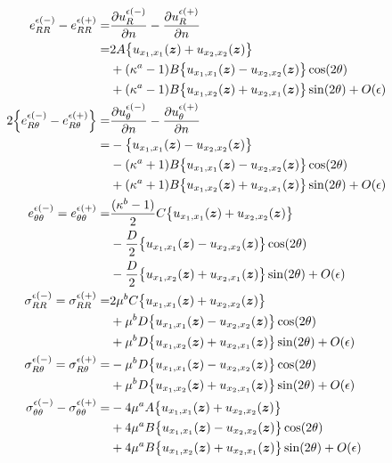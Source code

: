 \begin{align}
	e_{RR}^{\epsilon(-)}-e_{RR}^{\epsilon(+)}
		=&\frac{\partial u_{R}^{\epsilon(-)}}{\partial n}-\frac{\partial u_{R}^{\epsilon(+)}}{\partial n}
		\nonumber
		\\
		=&2A\bigl\{u_{x_{1},x_{1}}(\bm{z})+u_{x_{2},x_{2}}(\bm{z})\bigr\}
		\nonumber
		\\
		&+(\kappa^{a}-1)B\bigl\{u_{x_{1},x_{1}}(\bm{z})-u_{x_{2},x_{2}}(\bm{z})\bigr\}\cos(2\theta)
		\nonumber
		\\
		&+(\kappa^{a}-1)B\bigl\{u_{x_{1},x_{2}}(\bm{z})+u_{x_{2},x_{1}}(\bm{z})\bigr\}\sin(2\theta)+O(\epsilon)
		\nonumber
		\\
	2\Bigl\{e_{R\theta}^{\epsilon(-)}-e_{R\theta}^{\epsilon(+)}\Bigr\}
		=&\frac{\partial u_{\theta}^{\epsilon(-)}}{\partial n}-\frac{\partial u_{\theta}^{\epsilon(+)}}{\partial n}
		\nonumber
		\\
		=&-\bigl\{u_{x_{1},x_{1}}(\bm{z})-u_{x_{2},x_{2}}(\bm{z})\bigr\}
		\nonumber
		\\
		&-(\kappa^{a}+1)B\bigl\{u_{x_{1},x_{1}}(\bm{z})-u_{x_{2},x_{2}}(\bm{z})\bigr\}\cos(2\theta)
		\nonumber
		\\
		&+(\kappa^{a}+1)B\bigl\{u_{x_{1},x_{2}}(\bm{z})+u_{x_{2},x_{1}}(\bm{z})\bigr\}\sin(2\theta)+O(\epsilon)
		\nonumber
		\\
	e_{\theta\theta}^{\epsilon(-)}=e_{\theta\theta}^{\epsilon(+)}
		=&\frac{(\kappa^{b}-1)}{2}C\bigl\{u_{x_{1},x_{1}}(\bm{z})+u_{x_{2},x_{2}}(\bm{z})\bigr\}
		\nonumber
		\\
		&-\frac{D}{2}\bigl\{u_{x_{1},x_{1}}(\bm{z})-u_{x_{2},x_{2}}(\bm{z})\bigr\}\cos(2\theta)
		\nonumber
		\\
		&-\frac{D}{2}\bigl\{u_{x_{1},x_{2}}(\bm{z})+u_{x_{2},x_{1}}(\bm{z})\bigr\}\sin(2\theta)+O(\epsilon)
		\nonumber
		\\
	\sigma_{RR}^{\epsilon(-)}=\sigma_{RR}^{\epsilon(+)}
		=&2\mu^{b}C\bigl\{u_{x_{1},x_{1}}(\bm{z})+u_{x_{2},x_{2}}(\bm{z})\bigr\}
		\nonumber
		\\
		&+\mu^{b}D\bigl\{u_{x_{1},x_{1}}(\bm{z})-u_{x_{2},x_{2}}(\bm{z})\bigr\}\cos(2\theta)
		\nonumber
		\\
		&+\mu^{b}D\bigl\{u_{x_{1},x_{2}}(\bm{z})+u_{x_{2},x_{1}}(\bm{z})\bigr\}\sin(2\theta)+O(\epsilon)
		\nonumber
		\\
	\sigma_{R\theta}^{\epsilon(-)}=\sigma_{R\theta}^{\epsilon(+)}
		=&-\mu^{b}D\bigl\{u_{x_{1},x_{1}}(\bm{z})-u_{x_{2},x_{2}}(\bm{z})\bigr\}\cos(2\theta)
		\nonumber
		\\
		&+\mu^{b}D\bigl\{u_{x_{1},x_{2}}(\bm{z})+u_{x_{2},x_{1}}(\bm{z})\bigr\}\sin(2\theta)+O(\epsilon)
		\nonumber
		\\
	\sigma_{\theta\theta}^{\epsilon(-)}-\sigma_{\theta\theta}^{\epsilon(+)}
		=&-4\mu^{a}A\bigl\{u_{x_{1},x_{1}}(\bm{z})+u_{x_{2},x_{2}}(\bm{z})\bigr\}
		\nonumber
		\\
		&+4\mu^{a}B\bigl\{u_{x_{1},x_{1}}(\bm{z})-u_{x_{2},x_{2}}(\bm{z})\bigr\}\cos(2\theta)
		\nonumber
		\\
		&+4\mu^{a}B\bigl\{u_{x_{1},x_{2}}(\bm{z})+u_{x_{2},x_{1}}(\bm{z})\bigr\}\sin(2\theta)+O(\epsilon)
	\label{eq:eThThOutEpsSol}
\end{align}
